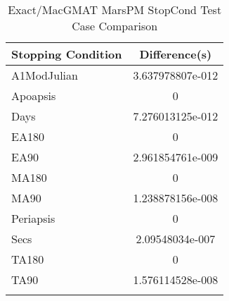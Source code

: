 \begin{table}[htbp!]
\centering
\caption{ Exact/MacGMAT MarsPM StopCond Test Case Comparison}
      \begin{tabular}{lc}
      \hline\hline
          Stopping Condition & Difference(s) \\
         \hline
         A1ModJulian & 3.637978807e-012 \\
         Apoapsis & 0 \\
         Days & 7.276013125e-012 \\
         EA180 & 0 \\
         EA90 & 2.961854761e-009 \\
         MA180 & 0 \\
         MA90 & 1.238878156e-008 \\
         Periapsis & 0 \\
         Secs & 2.09548034e-007 \\
         TA180 & 0 \\
         TA90 & 1.576114528e-008 \\
      \hline\hline
      \label{Table: Exact-MacGMAT MarsPM StopCond Table} 
\end{tabular}
\end{table}
